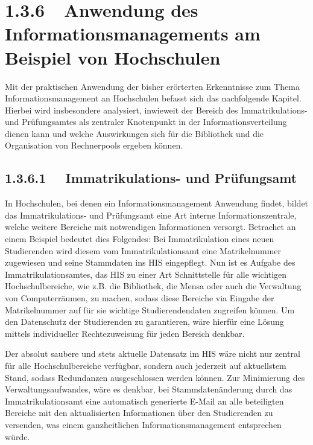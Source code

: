 \documentclass[a4paper]{article}
\begin{document}
\section[1.3.6\ \ Anwendung des Informationsmanagements am Beispiel von Hochschulen]{1.3.6\ \ Anwendung des
Informationsmanagements am Beispiel von Hochschulen}
{\sffamily\color{black}
Mit der praktischen Anwendung der bisher erörterten Erkenntnisse zum Thema Informationsmanagement an Hochschulen befasst
sich das nachfolgende Kapitel. Hierbei wird insbesondere analysiert, inwieweit der Bereich des Immatrikulations- und
Prüfungsamtes als zentraler Knotenpunkt in der Informationsverteilung dienen kann und welche Auswirkungen sich für die
Bibliothek und die Organisation von Rechnerpools ergeben können.}

\subsection[1.3.6.1 \ \ Immatrikulations{}- und Prüfungsamt ]{\color{black} 1.3.6.1 \ \ Immatrikulations- und
Prüfungsamt }
{\sffamily\color{black}
In Hochschulen, bei denen ein Informationsmanagement Anwendung findet, bildet das Immatrikulations- und Prüfungsamt eine
Art interne Informationszentrale, welche weitere Bereiche mit notwendigen Informationen versorgt. Betrachet an einem
Beispiel bedeutet dies Folgendes: Bei Immatrikulation eines neuen Studierenden wird diesem vom Immatrikulationsamt eine
Matrikelnummer zugewiesen und seine Stammdaten ins HIS eingepflegt. Nun ist es Aufgabe des Immatrikulationsamtes, das
HIS zu einer Art Schnittstelle für alle wichtigen Hochschulbereiche, wie z.B. die Bibliothek, die Mensa oder auch die
Verwaltung von Computerräumen, zu machen, sodass diese Bereiche via Eingabe der Matrikelnummer auf für sie wichtige
Studierendendaten zugreifen können. Um den Datenschutz der Studierenden zu garantieren, wäre hierfür eine Lösung
mittels individueller Rechtezuweisung für jeden Bereich denkbar. }


\bigskip

{\sffamily\color{black}
Der absolut saubere und stets aktuelle Datensatz im HIS wäre nicht nur zentral für alle Hochschulbereiche verfügbar,
sondern auch jederzeit auf aktuellstem Stand, sodass Redundanzen ausgeschlossen werden können. Zur Minimierung des
Verwaltungsaufwandes, wäre es denkbar, bei Stammdatenänderung durch das Immatrikulationsamt eine automatisch generierte
E-Mail an alle beteiligten Bereiche mit den aktualisierten Informationen über den Studierenden zu versenden, was einem
ganzheitlichen Informationsmanagement entsprechen würde.}
\end{document}
